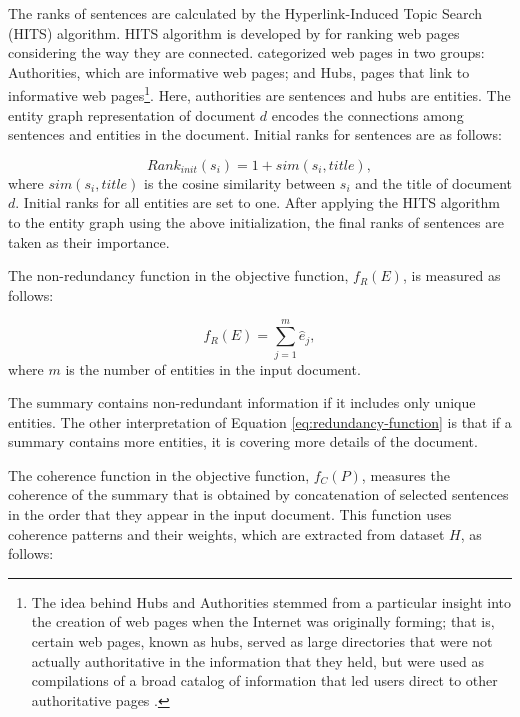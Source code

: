 The ranks of sentences are calculated  by the \mbox{Hyperlink-Induced} Topic Search (HITS) algorithm.
HITS algorithm is developed by  for ranking web pages considering the way they are connected.  
 categorized web pages in two groups:  Authorities, which are informative web pages; and Hubs, pages that link to informative web pages\footnote{The idea behind Hubs and Authorities stemmed from a particular insight into the creation of web pages when the Internet was originally forming; that is, certain web pages, known as hubs, served as large directories that were not actually authoritative in the information that they held, but were used as compilations of a broad catalog of information that led users direct to other authoritative pages \cite{}.}.
Here, authorities are sentences and hubs are entities.  
The entity graph representation of document $d$ encodes the connections among sentences and entities in the document. 
Initial ranks for sentences are as follows:

\begin{equation}
Rank_{init}(s_i)= 1 + sim (s_i, title),
\end{equation}
where $sim(s_i, title)$ is the cosine similarity between $s_i$ and the title of document $d$. 
Initial ranks for all entities are set to one. 
After applying the HITS algorithm to the entity graph using the above initialization, the final ranks of sentences are taken as their importance. 

The non-redundancy function in the objective function, $f_R(E)$,    
is measured as follows:

\begin{equation}
\label{eq:redundancy-function}
f_R(E) = \sum_{j=1}^{m}{\hat{e}_j},
\end{equation}
where $m$ is the number of entities in the input document. 

The summary contains non-redundant information if it includes only unique entities. 
The other interpretation of Equation \ref{eq:redundancy-function} is that if a summary contains more entities, it is covering more details of the document. 

The coherence function in the objective function, $f_C(P)$, measures the coherence of the summary that is obtained by concatenation of selected sentences in the order that they appear in the input document. 
This function uses coherence patterns and their weights, which are extracted from dataset $H$, as follows:

